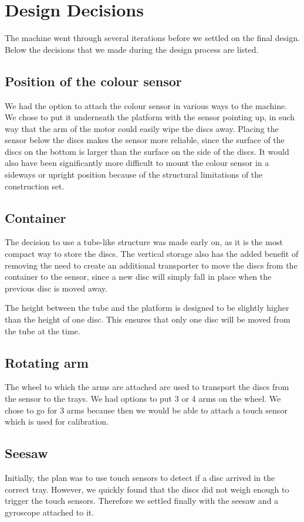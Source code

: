 \documentclass[a4paper,oneside,11pt]{article}
\begin{document}
\section{Design Decisions}
The machine went through several iterations before we settled on the final design. Below the decisions that we made during the design process are listed.

\subsection{Position of the colour sensor}
We had the option to attach the colour sensor in various ways to the machine. We chose to put it underneath the platform with the sensor pointing up, in such way that the arm of the motor could easily wipe the discs away.  Placing the sensor below the discs makes the sensor more reliable, since the surface of the discs on the bottom is larger than the surface on the side of the discs. It would also have been significantly more difficult to mount the colour sensor in a sideways or upright position because of the structural limitations of the construction set.

\subsection{Container}
The decision to use a tube-like structure was made early on, as it is the most compact way to store the discs. The vertical storage also has the added benefit of removing the need to create an additional transporter to move the discs from the container to the sensor, since a new disc will simply fall in place when the previous disc is moved away.

The height between the tube and the platform is designed to be slightly higher than the height of one disc. This ensures that only one disc will be moved from the tube at the time.

\subsection{Rotating arm}
The wheel to which the arms are attached are used to transport the discs from the sensor to the trays. We had options to put 3 or 4 arms on the wheel. We chose to go for 3 arms because then we would be able to attach a touch sensor which is used for calibration.

\subsection{Seesaw}
Initially, the plan was to use touch sensors to detect if a disc arrived in the correct tray. However, we quickly found that the discs did not weigh enough to trigger the touch sensors. Therefore we settled finally with the seesaw and a gyroscope attached to it.
\end{document}

